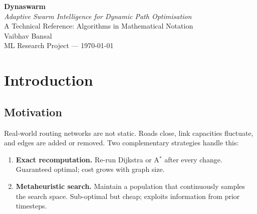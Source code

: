 \documentclass[11pt,a4paper]{article}
\theoremstyle{definition}
\begin{document}
\begin{titlepage}
  \centering\vspace*{3cm}
  {\Huge\bfseries Dynaswarm}\\[0.6em]
  {\Large\itshape Adaptive Swarm Intelligence for Dynamic Path Optimisation}\\[0.4em]
  {\large A Technical Reference: Algorithms in Mathematical Notation}\\[3cm]
  {\large Vaibhav Bansal}\\[0.5em]
  {\normalsize ML Research Project --- \today}\\[4cm]
  \begin{abstract}
    \noindent
    We study whether an online adaptive controller that monitors environment volatility
    and incrementally retunes optimiser parameters can outperform a carefully tuned
    \emph{static} configuration when searching for shortest paths in dynamically disrupted
    networks.  Four algorithms are investigated: the exact reference A$^*$, the MAX--MIN
    Ant Colony Optimiser (MMAS), a priority-vector Particle Swarm Optimiser (PSO), and a
    budget-sharing hybrid.  The hybrid rests on a falsifiable prediction: the memoryless
    swarm covers the colony's staleness window immediately after a disruption.  Across 400
    independent trials the adaptive controller yields no statistically significant
    improvement; we discuss why and what the result implies for future work.
  \end{abstract}
\end{titlepage}

\tableofcontents\newpage

\section{Introduction}

\subsection{Motivation}

Real-world routing networks are not static. Roads close, link capacities fluctuate, and
edges are added or removed.  Two complementary strategies handle this:

\begin{enumerate}[label=(\roman*)]
  \item \textbf{Exact recomputation.}  Re-run Dijkstra or A$^*$ after every change.
        Guaranteed optimal; cost grows with graph size.
  \item \textbf{Metaheuristic search.}  Maintain a population that continuously samples
        the search space.  Sub-optimal but cheap; exploits information from prior timesteps.
\end{enumerate}
\end{document}
